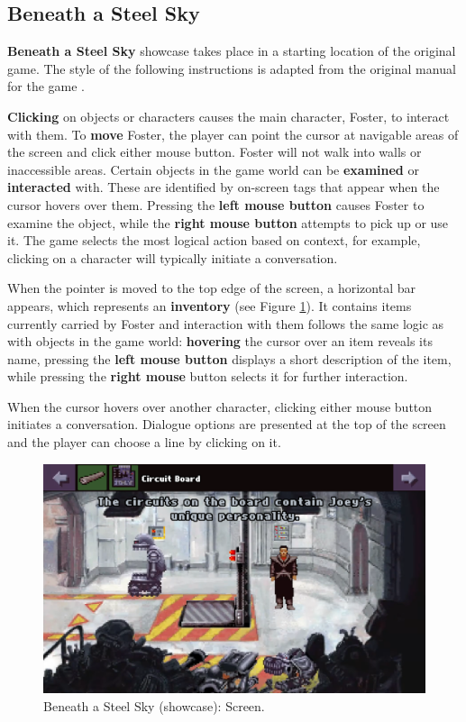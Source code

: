 \subsection{Beneath a Steel Sky}
\textbf{Beneath a Steel Sky} showcase takes place in a starting location of the original game. The style of the following instructions is adapted from the original manual for the game \cite{BaSS-Manual}.

\textbf{Clicking} on objects or characters causes the main character, Foster, to interact with them. To \textbf{move} Foster, the player can point the cursor at navigable areas of the screen and click either mouse button. Foster will not walk into walls or inaccessible areas. Certain objects in the game world can be \textbf{examined} or \textbf{interacted} with. These are identified by on-screen tags that appear when the cursor hovers over them. Pressing the \textbf{left mouse button} causes Foster to examine the object, while the \textbf{right mouse button} attempts to pick up or use it. The game selects the most logical action based on context, for example, clicking on a character will typically initiate a conversation. 

When the pointer is moved to the top edge of the screen, a horizontal bar appears, which represents an \textbf{inventory} (see Figure \ref{fig:BaSS-manual}). It contains items currently carried by Foster and interaction with them follows the same logic as with objects in the game world: \textbf{hovering} the cursor over an item reveals its name, pressing the \textbf{left mouse button} displays a short description of the item, while pressing the \textbf{right mouse} button selects it for further interaction. 

When the cursor hovers over another character, clicking either mouse button initiates a conversation. Dialogue options are presented at the top of the screen and the player can choose a line by clicking on it. 

\begin{figure}[H]
\centering
\includegraphics[width=.8\linewidth]{img/manual.png}
\caption{Beneath a Steel Sky (showcase): Screen.}
\label{fig:BaSS-manual}
\end{figure}

